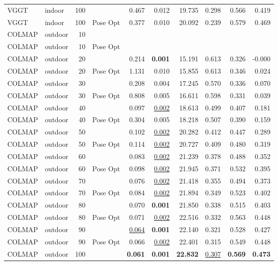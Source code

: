 \begin{table}[H]
\begin{tabular}{llrlrrrrrr}
VGGT & indoor & 100 &  & 0.467 & 0.012 & 19.735 & 0.298 & 0.566 & 0.419 \\
VGGT & indoor & 100 & Pose Opt & 0.377 & 0.010 & 20.092 & 0.239 & 0.579 & 0.469 \\
\midrule
COLMAP & outdoor & 10 &  &  &  &  &  &  &  \\
COLMAP & outdoor & 10 & Pose Opt &  &  &  &  &  &  \\
COLMAP & outdoor & 20 &  & 0.214 & \textbf{0.001} & 15.191 & 0.613 & 0.326 & -0.000 \\
COLMAP & outdoor & 20 & Pose Opt & 1.131 & 0.010 & 15.855 & 0.613 & 0.346 & 0.024 \\
COLMAP & outdoor & 30 &  & 0.208 & 0.004 & 17.245 & 0.570 & 0.336 & 0.070 \\
COLMAP & outdoor & 30 & Pose Opt & 0.808 & 0.005 & 16.611 & 0.598 & 0.331 & 0.039 \\
COLMAP & outdoor & 40 &  & 0.097 & \underline{0.002} & 18.613 & 0.499 & 0.407 & 0.181 \\
COLMAP & outdoor & 40 & Pose Opt & 0.304 & 0.005 & 18.218 & 0.507 & 0.390 & 0.159 \\
COLMAP & outdoor & 50 &  & 0.102 & \underline{0.002} & 20.282 & 0.412 & 0.447 & 0.289 \\
COLMAP & outdoor & 50 & Pose Opt & 0.114 & \underline{0.002} & 20.727 & 0.409 & 0.480 & 0.319 \\
COLMAP & outdoor & 60 &  & 0.083 & \underline{0.002} & 21.239 & 0.378 & 0.488 & 0.352 \\
COLMAP & outdoor & 60 & Pose Opt & 0.098 & \underline{0.002} & 21.945 & 0.371 & 0.532 & 0.395 \\
COLMAP & outdoor & 70 &  & 0.076 & \underline{0.002} & 21.418 & 0.355 & 0.494 & 0.373 \\
COLMAP & outdoor & 70 & Pose Opt & 0.084 & \underline{0.002} & 21.894 & 0.349 & 0.523 & 0.402 \\
COLMAP & outdoor & 80 &  & 0.070 & \textbf{0.001} & 21.850 & 0.338 & 0.515 & 0.403 \\
COLMAP & outdoor & 80 & Pose Opt & 0.071 & \underline{0.002} & 22.516 & 0.332 & 0.563 & 0.448 \\
COLMAP & outdoor & 90 &  & \underline{0.064} & \textbf{0.001} & 22.140 & 0.321 & 0.528 & 0.427 \\
COLMAP & outdoor & 90 & Pose Opt & 0.066 & \underline{0.002} & 22.401 & 0.315 & 0.549 & 0.448 \\
COLMAP & outdoor & 100 &  & \textbf{0.061} & \textbf{0.001} & \textbf{22.832} & \underline{0.307} & \textbf{0.569} & \textbf{0.473} \\

\end{tabular}
\end{table}
